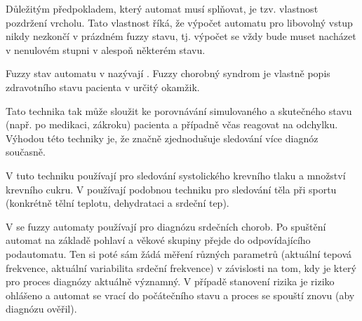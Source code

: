\documentclass[a4paper,10pt]{article}
\begin{document}
Důležitým předpokladem, který automat musí splňovat, je tzv. vlastnost pozdržení vrcholu. Tato vlastnost říká, že výpočet automatu pro libovolný vstup nikdy nezkončí v prázdném fuzzy stavu, tj. výpočet se vždy bude muset nacházet v nenulovém stupni v alespoň některém stavu.


Fuzzy stav automatu v \cite{GupRah-CliMonUsFuzSys} nazývají . Fuzzy chorobný syndrom je vlastně popis zdravotního stavu pacienta v určitý okamžik. 

Tato technika tak může sloužit ke porovnávání simulovaného a skutečného stavu (např. po medikaci, zákroku) pacienta a případně včas reagovat na odchylku. Výhodou této techniky je, že značně zjednodušuje sledování více diagnóz současně.

V \cite{GupRah-CliMonUsFuzSys} tuto techniku používají pro sledování systolického krevního tlaku a množství krevního cukru. V \cite{Jia+-ExHeaSimMetBasIntHumTheMod} používají podobnou techniku pro sledování těla při sportu (konkrétně tělní teplotu, dehydrataci a srdeční tep).

V \cite{CamMerNun-UsFuzAutDiagPrHeaPro} se fuzzy automaty používají pro diagnózu srdečních chorob. Po spuštění automat na základě pohlaví a věkové skupiny přejde do odpovídajícího podautomatu. Ten si poté sám žádá měření různých parametrů (aktuální tepová frekvence, aktuální variabilita srdeční frekvence) v závislosti na tom, kdy je který pro proces diagnózy aktuálně významný. V případě stanovení rizika je riziko ohlášeno a automat se vrací do počátečního stavu a proces se spouští znovu (aby diagnózu ověřil). 
\end{document}
